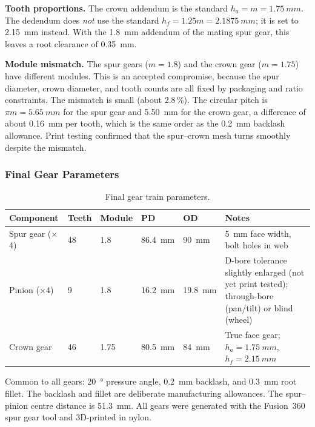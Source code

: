 \documentclass[12pt,a4paper]{article}
\begin{document}
\textbf{Tooth proportions.} The crown addendum is the standard
$h_a = m = \SI{1.75}{mm}$. The dedendum does \emph{not} use the standard
$h_f = 1.25m = \SI{2.1875}{mm}$; it is set to \SI{2.15}{mm} instead. With the
\SI{1.8}{mm} addendum of the mating spur gear, this leaves a root clearance of
\SI{0.35}{mm}.

\textbf{Module mismatch.} The spur gears ($m = 1.8$) and the crown gear
($m = 1.75$) have different modules. This is an accepted compromise, because the
spur diameter, crown diameter, and tooth counts are all fixed by packaging and
ratio constraints. The mismatch is small (about 2.8\,\%). The circular pitch is
$\pi m = \SI{5.65}{mm}$ for the spur gear and \SI{5.50}{mm} for the crown gear,
a difference of about \SI{0.16}{mm} per tooth, which is the same order as the
\SI{0.2}{mm} backlash allowance. Print testing confirmed that the spur--crown
mesh turns smoothly despite the mismatch.

\subsubsection{Final Gear Parameters}

\begin{table}[H]
	\centering\small
	\caption{Final gear train parameters.}
	\label{tab:final-params}
	\begin{tabular}{lllllp{4.2cm}}
		\toprule
		\textbf{Component} & \textbf{Teeth} & \textbf{Module} & \textbf{PD} & \textbf{OD} & \textbf{Notes} \\
		\midrule
		Spur gear ($\times$4) & 48 & \num{1.8} & \SI{86.4}{mm} & \SI{90}{mm} &
		\SI{5}{mm} face width, bolt holes in web \\
		\addlinespace
		Pinion ($\times$4) & 9 & \num{1.8} & \SI{16.2}{mm} & \SI{19.8}{mm} &
		D-bore tolerance slightly enlarged (not yet print tested); through-bore
		(pan/tilt) or blind (wheel) \\
		\addlinespace
		Crown gear & 46 & \num{1.75} & \SI{80.5}{mm} & \SI{84}{mm} &
		True face gear; $h_a = \SI{1.75}{mm}$, $h_f = \SI{2.15}{mm}$ \\
		\bottomrule
	\end{tabular}
\end{table}

Common to all gears: \SI{20}{\degree} pressure angle, \SI{0.2}{mm} backlash, and
\SI{0.3}{mm} root fillet. The backlash and fillet are deliberate manufacturing
allowances. The spur--pinion centre distance is \SI{51.3}{mm}. All gears were
generated with the Fusion~360 spur gear tool and 3D-printed in nylon.
\end{document}
